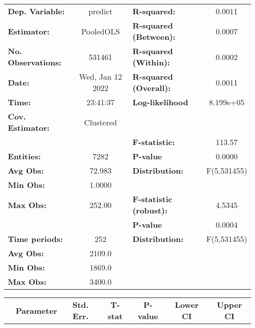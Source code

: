 \begin{center}
\begin{tabular}{lclc}
\toprule
\textbf{Dep. Variable:}    &      predict       & \textbf{  R-squared:         }   &      0.0011      \\
\textbf{Estimator:}        &     PooledOLS      & \textbf{  R-squared (Between):}  &      0.0007      \\
\textbf{No. Observations:} &       531461       & \textbf{  R-squared (Within):}   &      0.0002      \\
\textbf{Date:}             &  Wed, Jan 12 2022  & \textbf{  R-squared (Overall):}  &      0.0011      \\
\textbf{Time:}             &      23:41:37      & \textbf{  Log-likelihood     }   &    8.199e+05     \\
\textbf{Cov. Estimator:}   &     Clustered      & \textbf{                     }   &                  \\
\textbf{}                  &                    & \textbf{  F-statistic:       }   &      113.57      \\
\textbf{Entities:}         &        7282        & \textbf{  P-value            }   &      0.0000      \\
\textbf{Avg Obs:}          &       72.983       & \textbf{  Distribution:      }   &   F(5,531455)    \\
\textbf{Min Obs:}          &       1.0000       & \textbf{                     }   &                  \\
\textbf{Max Obs:}          &       252.00       & \textbf{  F-statistic (robust):} &      4.5345      \\
\textbf{}                  &                    & \textbf{  P-value            }   &      0.0004      \\
\textbf{Time periods:}     &        252         & \textbf{  Distribution:      }   &   F(5,531455)    \\
\textbf{Avg Obs:}          &       2109.0       & \textbf{                     }   &                  \\
\textbf{Min Obs:}          &       1869.0       & \textbf{                     }   &                  \\
\textbf{Max Obs:}          &       3400.0       & \textbf{                     }   &                  \\
\bottomrule
\end{tabular}
\begin{tabular}{lcccccc}
                & \textbf{Parameter} & \textbf{Std. Err.} & \textbf{T-stat} & \textbf{P-value} & \textbf{Lower CI} & \textbf{Upper CI}  \\

\end{tabular}
\end{center}
